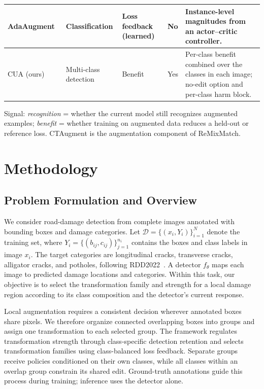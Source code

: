 \documentclass[conference]{IEEEtran}
\begin{document}
\begin{table}[t]
\begin{tabularx}{\textwidth}{@{}p{}p{}p{}p{}Y@{}}
AdaAugment~\cite{yang2025adaaugment} & Classification & Loss feedback (learned) & No & Instance-level magnitudes from an actor--critic controller. \\
\midrule
CUA (ours) & Multi-class detection & Benefit & Yes & Per-class benefit combined over the classes in each image; no-edit option and per-class harm block. \\
\bottomrule
\end{tabularx}
\vspace{3pt}
\begin{minipage}{\textwidth}
\footnotesize
Signal: \emph{recognition} = whether the current model still recognizes augmented examples; \emph{benefit} = whether training on augmented data reduces a held-out or reference loss. CTAugment is the augmentation component of ReMixMatch.
\end{minipage}
\end{table}

\section{Methodology}
\label{sec:method}

\subsection{Problem Formulation and Overview}
\label{sec:method_problem}

We consider road-damage detection from complete images annotated with bounding boxes and damage categories. Let $\mathcal{D}=\{(x_i,Y_i)\}_{i=1}^{N}$ denote the training set, where $Y_i=\{(b_{ij},c_{ij})\}_{j=1}^{n_i}$ contains the boxes and class labels in image $x_i$. The target categories are longitudinal cracks, transverse cracks, alligator cracks, and potholes, following RDD2022~\cite{arya2024rdd}. A detector $f_\theta$ maps each image to predicted damage locations and categories. Within this task, our objective is to select the transformation family and strength for a local damage region according to its class composition and the detector's current response.

Local augmentation requires a consistent decision wherever annotated boxes share pixels. We therefore organize connected overlapping boxes into groups and assign one transformation to each selected group. The framework regulates transformation strength through class-specific detection retention and selects transformation families using class-balanced loss feedback. Separate groups receive policies conditioned on their own classes, while all classes within an overlap group constrain its shared edit. Ground-truth annotations guide this process during training; inference uses the detector alone.
\end{document}
